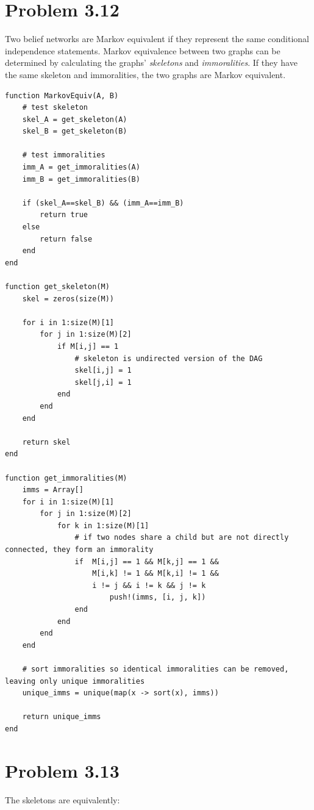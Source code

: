 \documentclass[11pt,a4paper,oneside]{report}
\begin{document}
\section*{Problem 3.12}
Two belief networks are Markov equivalent if they represent the same conditional
independence statements. Markov equivalence between two graphs can be determined
by calculating the graphs' \emph{skeletons} and \emph{immoralities}. If they
have the same skeleton and immoralities, the two graphs are Markov equivalent.

\begin{lstlisting}
function MarkovEquiv(A, B)
    # test skeleton
    skel_A = get_skeleton(A)
    skel_B = get_skeleton(B)

    # test immoralities
    imm_A = get_immoralities(A)
    imm_B = get_immoralities(B)

    if (skel_A==skel_B) && (imm_A==imm_B)
        return true
    else
        return false
    end
end

function get_skeleton(M)
    skel = zeros(size(M))

    for i in 1:size(M)[1]
        for j in 1:size(M)[2]
            if M[i,j] == 1
                # skeleton is undirected version of the DAG
                skel[i,j] = 1
                skel[j,i] = 1
            end
        end
    end

    return skel
end

function get_immoralities(M)
    imms = Array[]
    for i in 1:size(M)[1]
        for j in 1:size(M)[2]
            for k in 1:size(M)[1]
                # if two nodes share a child but are not directly connected, they form an immorality
                if  M[i,j] == 1 && M[k,j] == 1 &&
                    M[i,k] != 1 && M[k,i] != 1 && 
                    i != j && i != k && j != k
                        push!(imms, [i, j, k])
                end
            end
        end
    end

    # sort immoralities so identical immoralities can be removed, leaving only unique immoralities
    unique_imms = unique(map(x -> sort(x), imms))

    return unique_imms
end
\end{lstlisting}


\section*{Problem 3.13}
The skeletons are equivalently:
\end{document}
